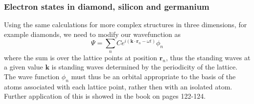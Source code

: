 \documentclass[11pt]{article}
\begin{document}
\subsubsection{Electron states in diamond, silicon and germanium}
Using the same calculations for more complex structures in three dimensions, for example diamonds, we need to modify our wavefunction as 
\begin{equation}
	\Psi = \sum_n C e^{i(\pmb{k} \cdot \pmb{r}_n - \omega t)} \phi_n
\end{equation}
where the sum is over the lattice points at position $\pmb{r}_n$, thus the standing waves at a given value $\pmb{k}$ is standing waves determined by the periodicity of the lattice. The wave function $\phi_n$ must thus be an orbital appropriate to the basis of the atoms associated with each lattice point, rather then with an isolated atom. Further application of this is showed in the book on pages 122-124.
\end{document}
